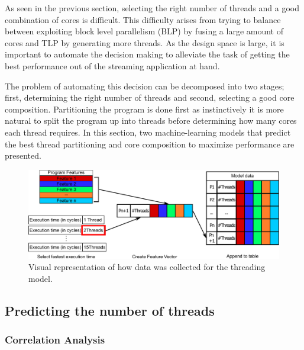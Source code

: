 As seen in the previous section, selecting the right number of threads and a good combination of cores is difficult.
This difficulty arises from trying to balance between exploiting block level parallelism (BLP) by fusing a large amount of cores and TLP by generating more threads.
As the design space is large, it is important to automate the decision making to alleviate the task of getting the best performance out of the streaming application at hand.

The problem of automating this decision can be decomposed into two stages; first, determining the right number of threads and second, selecting a good core composition.
Partitioning the program is done first as instinctively it is more natural to split the program up into threads before determining how many cores each thread requires.
In this section, two machine-learning models that predict the best thread partitioning and core composition to maximize performance are presented.

\begin{figure}[t]
  \centering
 \includegraphics[width=1\textwidth]{streamit-paper/graphics/thread_expl.pdf}
  \caption{Visual representation of how data was collected for the threading model.}\label{fig:thread_expl}
\end{figure}
\subsection{Predicting the number of threads}
\subsubsection{Correlation Analysis}

